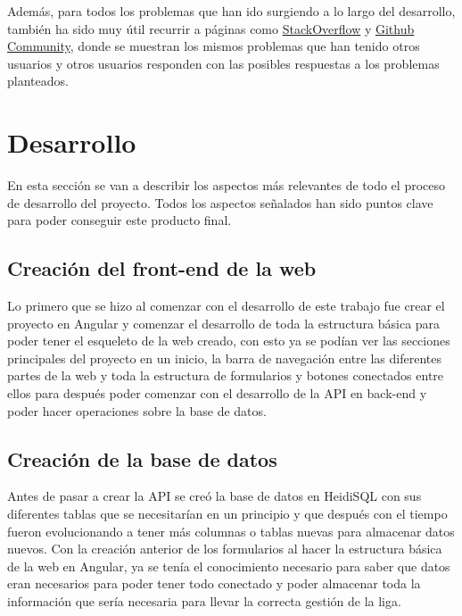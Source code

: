 Además, para todos los problemas que han ido surgiendo a lo largo del desarrollo, también ha sido muy útil recurrir a páginas como \href{https://stackoverflow.com/questions}{StackOverflow} y \href{https://github.com/community}{Github Community}, donde se muestran los mismos problemas que han tenido otros usuarios y otros usuarios responden con las posibles respuestas a los problemas planteados.

\section{Desarrollo}\label{desarrollo}

En esta sección se van a describir los aspectos más relevantes de todo el proceso de desarrollo del proyecto. Todos los aspectos señalados han sido puntos clave para poder conseguir este producto final.

\subsection{Creación del front-end de la web}

Lo primero que se hizo al comenzar con el desarrollo de este trabajo fue crear el proyecto en Angular y comenzar el desarrollo de toda la estructura básica para poder tener el esqueleto de la web creado, con esto ya se podían ver las secciones principales del proyecto en un inicio, la barra de navegación entre las diferentes partes de la web y toda la estructura de formularios y botones conectados entre ellos para después poder comenzar con el desarrollo de la API en back-end y poder hacer operaciones sobre la base de datos.



\subsection{Creación de la base de datos}

Antes de pasar a crear la API se creó la base de datos en HeidiSQL con sus diferentes tablas que se necesitarían en un principio y que después con el tiempo fueron evolucionando a tener más columnas o tablas nuevas para almacenar datos nuevos. Con la creación anterior de los formularios al hacer la estructura básica de la web en Angular, ya se tenía el conocimiento necesario para saber que datos eran necesarios para poder tener todo conectado y poder almacenar toda la información que sería necesaria para llevar la correcta gestión de la liga.


